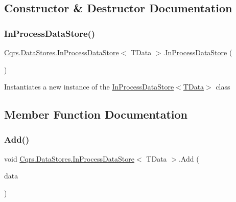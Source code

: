 \subsection{Constructor \& Destructor Documentation}
\mbox{\label{classCqrs_1_1DataStores_1_1InProcessDataStore_a86a0ef4945e0f2fa45027ceb3261d284}} 
\subsubsection{\texorpdfstring{In\+Process\+Data\+Store()}{InProcessDataStore()}}
{\footnotesize\ttfamily \hyperlink{classCqrs_1_1DataStores_1_1InProcessDataStore}{Cqrs.\+Data\+Stores.\+In\+Process\+Data\+Store}$<$ T\+Data $>$.\hyperlink{classCqrs_1_1DataStores_1_1InProcessDataStore}{In\+Process\+Data\+Store} (\begin{DoxyParamCaption}{ }\end{DoxyParamCaption})}



Instantiates a new instance of the \hyperlink{classCqrs_1_1DataStores_1_1InProcessDataStore_a86a0ef4945e0f2fa45027ceb3261d284}{In\+Process\+Data\+Store$<$\+T\+Data$>$} class 



\subsection{Member Function Documentation}
\mbox{\label{classCqrs_1_1DataStores_1_1InProcessDataStore_ade5c4033c628598665c0cba986a54c15}} 
\subsubsection{\texorpdfstring{Add()}{Add()}\hspace{0.1cm}{\footnotesize\ttfamily [1/2]}}
{\footnotesize\ttfamily void \hyperlink{classCqrs_1_1DataStores_1_1InProcessDataStore}{Cqrs.\+Data\+Stores.\+In\+Process\+Data\+Store}$<$ T\+Data $>$.Add (\begin{DoxyParamCaption}\item[{T\+Data}]{data }\end{DoxyParamCaption})}



